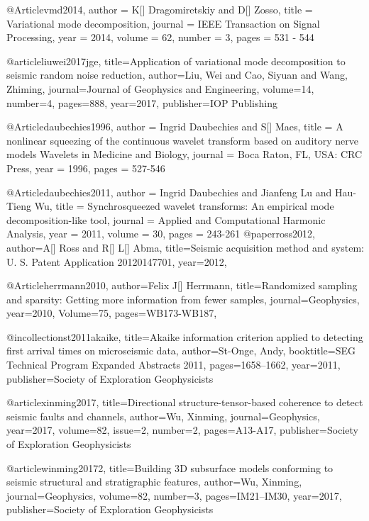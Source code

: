 @Article{vmd2014,
  author = 	 {K[] Dragomiretskiy and D[] Zosso},
  title = 	 {Variational mode decomposition},
  journal = 	 {IEEE Transaction on Signal Processing},
  year = 	 2014,
  volume = 62,
  number = 3,
  pages = 	 {531 - 544}
}


@article{liuwei2017jge,
  title={Application of variational mode decomposition to seismic random noise reduction},
  author={Liu, Wei and Cao, Siyuan and Wang, Zhiming},
  journal={Journal of Geophysics and Engineering},
  volume={14},
  number={4},
  pages={888},
  year={2017},
  publisher={IOP Publishing}
}

@Article{daubechies1996,
  author = 	 {Ingrid Daubechies and S[] Maes},
  title = 	 {A nonlinear squeezing of the continuous wavelet transform based on auditory nerve models Wavelets in Medicine and Biology},
  journal = 	 {Boca Raton, FL, USA: CRC Press},
  year = 	 1996,
  pages = 	 {527-546}
}

@Article{daubechies2011,
  author = 	 {Ingrid Daubechies and Jianfeng Lu and Hau-Tieng Wu},
  title = 	 {Synchrosqueezed wavelet transforms: An empirical mode decomposition-like tool},
  journal = 	 {Applied and Computational Harmonic Analysis},
  year = 	 2011,
  volume = 	 30,
  pages = 	 {243-261}
}
@paper{ross2012,
  author={A[] Ross and R[] L[] Abma},
  title={Seismic acquisition method and system: U. S. Patent Application
20120147701},
  year=2012,
}

@Article{herrmann2010,
  author={Felix J[] Herrmann},
  title={Randomized sampling and sparsity: Getting more information from fewer samples},
  journal={Geophysics},
  year=2010,
  Volume=75,
  pages={WB173-WB187},
}

@incollection{st2011akaike,
  title={Akaike information criterion applied to detecting first arrival times on microseismic data},
  author={St-Onge, Andy},
  booktitle={SEG Technical Program Expanded Abstracts 2011},
  pages={1658--1662},
  year={2011},
  publisher={Society of Exploration Geophysicists}
}

@article{xinming2017,
  title={Directional structure-tensor-based coherence to detect seismic faults and channels},
  author={Wu, Xinming},
  journal={Geophysics},
  year={2017},
  volume=82,
  issue=2,
  number=2,
  pages={A13-A17},
  publisher={Society of Exploration Geophysicists}
}

@article{winming20172,
  title={Building 3{D} subsurface models conforming to seismic structural and stratigraphic features},
  author={Wu, Xinming},
  journal={Geophysics},
  volume={82},
  number={3},
  pages={IM21--IM30},
  year={2017},
  publisher={Society of Exploration Geophysicists}
}

